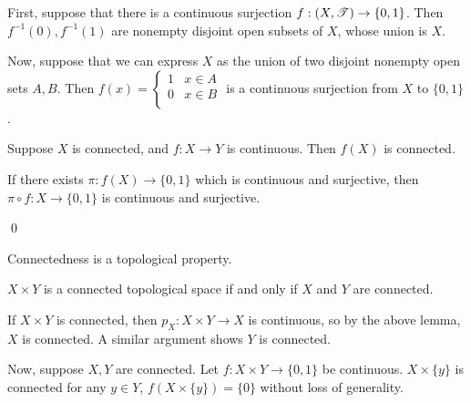 \documentclass[x11names,reqno,14pt]{extarticle}
\begin{document}
\proof

First, suppose that there is a continuous surjection $f:(X,\mathscr{T})\to\{0, 1\}$. Then $f^{-1}(0), f^{-1}(1)$ are nonempty disjoint open subsets of $X$, whose union is $X$. 

Now, suppose that we can express $X$ as the union of two disjoint nonempty open sets $A, B$. Then $f(x) = \begin{cases} 1 & x \in A \\ 0 & x \in B \\ \end{cases}$ is a continuous surjection from $X$ to $\{0,1\}$. 

\lem

Suppose $X$ is connected, and $f:X\to Y$ is continuous. Then $f(X)$ is connected.

\proof

If there exists $\pi:f(X)\to\{0, 1\}$ which is continuous and surjective, then $\pi \circ f :X\to\{0, 1\}$ is continuous and surjective. 

\qed

\cor

Connectedness is a topological property. 

\thm

$X \times Y$ is a connected topological space if and only if $X$ and $Y$ are connected. 

\proof

If $X \times Y$ is connected, then $p_X:X\times Y \to X$ is continuous, so by the above lemma, $X$ is connected. A similar argument shows $Y$ is connected. 

Now, suppose $X, Y$ are connected. Let $f:X\times Y\to\{0,1\}$ be continuous. $X\times\{y\}$ is connected for any $y \in Y$, $f(X\times\{y\}) = \{0\}$ without loss of generality. 
\end{document}
